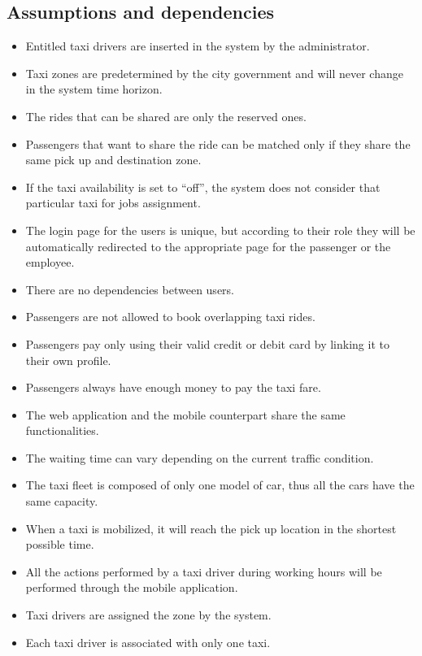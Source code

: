 \documentclass[a4paper,11pt]{report} %
\begin{document}
	\subsection{Assumptions and dependencies}
		\begin{itemize}
			\item Entitled taxi drivers are inserted in the system by the administrator.
			\item Taxi zones are predetermined by the city government and will never change in the system time horizon.
			\item The rides that can be shared are only the reserved ones.
			\item Passengers that want to share the ride can be matched only if they share the same pick up and destination zone.
			\item If the taxi availability is set to ``off'', the system does not consider that particular taxi for jobs assignment.
			\item The login page for the users is unique, but according to their role they will be automatically redirected to the appropriate page for the passenger or the employee.
			\item There are no dependencies between users.
			\item Passengers are not allowed to book overlapping taxi rides.
			\item Passengers pay only using their valid credit or debit card by linking it to their own profile.
			\item Passengers always have enough money to pay the taxi fare.
			\item The web application and the mobile counterpart share the same functionalities.
			\item The waiting time can vary depending on the current traffic condition.
			\item The taxi fleet is composed of only one model of car, thus all the cars have the same capacity.
			\item When a taxi is mobilized, it will reach the pick up location in the shortest possible time.
			\item All the actions performed by a taxi driver during working hours will be performed through the mobile application.
			\item Taxi drivers are assigned the zone by the system.
			\item Each taxi driver is associated with only one taxi.
		\end{itemize}
	
\end{document}
